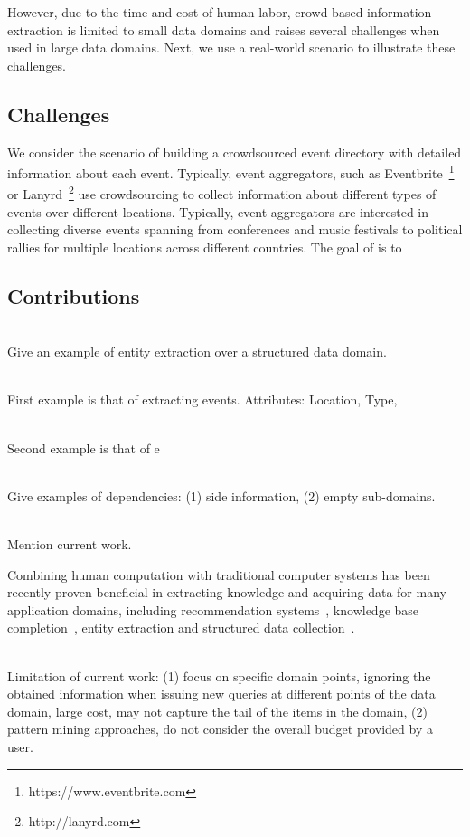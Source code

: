 \documentclass{sig-alternate}
\begin{document}
However, due to the time and cost of human labor, crowd-based information extraction is limited to small data domains and raises several challenges when used in large data domains. Next, we use a real-world scenario to illustrate these challenges.

\subsection{Challenges}
We consider the scenario of building a crowdsourced event directory with detailed information about each event. Typically, event aggregators, such as Eventbrite~\footnote{https://www.eventbrite.com} or Lanyrd~\footnote{http://lanyrd.com} use crowdsourcing to collect information about different types of events over different locations. Typically, event aggregators are interested in collecting diverse events spanning from conferences and music festivals to political rallies for multiple locations across different countries. The goal of is to 

\subsection{Contributions}

\ \\Give an example of entity extraction over a structured data domain.

\ \\First example is that of extracting events. Attributes: Location, Type, 

\ \\Second example is that of e

\ \\Give examples of dependencies: (1) side information, (2) empty sub-domains.

\ \\Mention current work.

Combining human computation with traditional computer systems has been recently proven beneficial in extracting knowledge and acquiring data for many application domains, including recommendation systems~\cite{amsterdamer:2014}, knowledge base completion~\cite{kondredi:2014, west:2014}, entity extraction and structured data collection~\cite{trushkowsky:2013, park:2014}. 

\ \\Limitation of current work: (1) focus on specific domain points, ignoring the obtained information when issuing new queries at different points of the data domain, large cost, may not capture the tail of the items in the domain, (2) pattern mining approaches, do not consider the overall budget provided by a user. 
\end{document}

